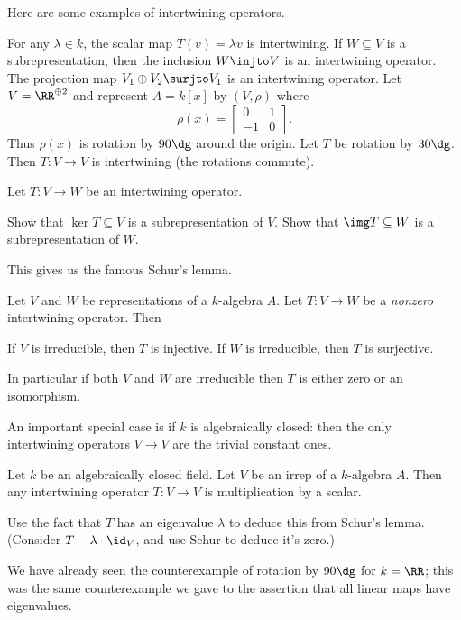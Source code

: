 Here are some examples of intertwining operators.
\begin{example}
	\listhack
	\begin{enumerate}[(a)]
		\ii For any $\lambda \in k$, the scalar map $T(v) = \lambda v$
		is intertwining.
		\ii If $W \subseteq V$ is a subrepresentation,
		then the inclusion $W \injto V$ is an intertwining operator.
		\ii The projection map $V_1 \oplus V_2 \surjto V_1$
		is an intertwining operator.
		\ii Let $V  = \RR^{\oplus 2}$ 
		and represent $A = k[x]$ by $(V, \rho)$ where
		\[ \rho(x) = \begin{bmatrix} 0 & 1 \\ -1 & 0 \end{bmatrix}. \]
		Thus $\rho(x)$ is rotation by $90\dg$ around the origin.
		Let $T$ be rotation by $30\dg$.
		Then $T : V \to V$ is intertwining (the rotations commute).
	\end{enumerate}
\end{example}

\begin{exercise}
	Let $T : V \to W$ be an intertwining operator.
	\begin{enumerate}[(a)]
		\ii Show that $\ker T \subseteq V$ is a subrepresentation of $V$.
		\ii Show that $\img T \subseteq W$ is a subrepresentation of $W$.
	\end{enumerate}
\end{exercise}

This gives us the famous Schur's lemma.
\begin{theorem}
	Let $V$ and $W$ be representations of a $k$-algebra $A$.
	Let $T : V \to W$ be a \emph{nonzero} intertwining operator.
	Then
	\begin{enumerate}[(a)]
		\ii If $V$ is irreducible, then $T$ is injective.
		\ii If $W$ is irreducible, then $T$ is surjective.
	\end{enumerate}
	In particular if both $V$ and $W$ are irreducible then $T$
	is either zero or an isomorphism.
\end{theorem}
An important special case is if $k$ is algebraically closed:
then the only intertwining operators $V \to V$
are the trivial constant ones.
\begin{theorem}
	Let $k$ be an algebraically closed field.
	Let $V$ be an irrep of a $k$-algebra $A$.
	Then any intertwining operator $T : V \to V$ is multiplication by a scalar.
\end{theorem}
\begin{exercise}
	Use the fact that $T$ has an eigenvalue $\lambda$ to
	deduce this from Schur's lemma.
	(Consider $T - \lambda \cdot \id_V$, and use Schur to deduce it's zero.)
\end{exercise}
We have already seen the counterexample of rotation by $90\dg$ for $k = \RR$;
this was the same counterexample we gave to the assertion that all linear maps
have eigenvalues.

